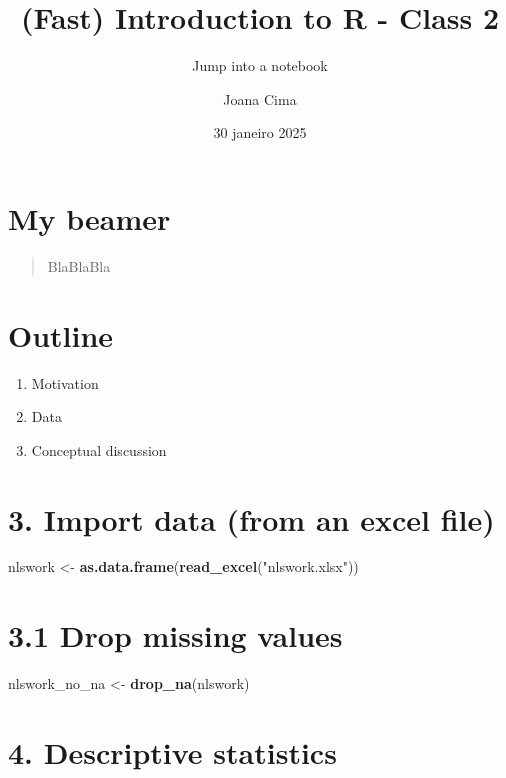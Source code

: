 \documentclass[
]{article}
\title{(Fast) Introduction to R - Class 2}
\subtitle{Jump into a notebook}
\author{Joana Cima}
\date{30 janeiro 2025}
\newenvironment{Shaded}{\begin{snugshade}}{\end{snugshade}}
\newcommand{\FunctionTok}[1]{\textcolor[rgb]{0.13,0.29,0.53}{\textbf{#1}}}
\newcommand{\NormalTok}[1]{#1}
\newcommand{\OtherTok}[1]{\textcolor[rgb]{0.56,0.35,0.01}{#1}}
\newcommand{\StringTok}[1]{\textcolor[rgb]{0.31,0.60,0.02}{#1}}
\providecommand{\tightlist}{%
  \setlength{\itemsep}{0pt}\setlength{\parskip}{0pt}}
\begin{document}
\maketitle

\section{My beamer}\label{my-beamer}

\begin{quote}
BlaBlaBla
\end{quote}

\section{Outline}\label{outline}

\begin{enumerate}
\def\labelenumi{\arabic{enumi}.}
\tightlist
\item
  Motivation
\item
  Data
\item
  Conceptual discussion
\end{enumerate}

\section{3. Import data (from an excel
file)}\label{import-data-from-an-excel-file}

\begin{Shaded}
\begin{Highlighting}[]
\NormalTok{nlswork }\OtherTok{\textless{}{-}} \FunctionTok{as.data.frame}\NormalTok{(}\FunctionTok{read\_excel}\NormalTok{(}\StringTok{"nlswork.xlsx"}\NormalTok{))}
\end{Highlighting}
\end{Shaded}

\section{3.1 Drop missing values}\label{drop-missing-values}

\begin{Shaded}
\begin{Highlighting}[]
\NormalTok{nlswork\_no\_na }\OtherTok{\textless{}{-}} \FunctionTok{drop\_na}\NormalTok{(nlswork)}
\end{Highlighting}
\end{Shaded}

\section{4. Descriptive statistics}\label{descriptive-statistics}
\end{document}
